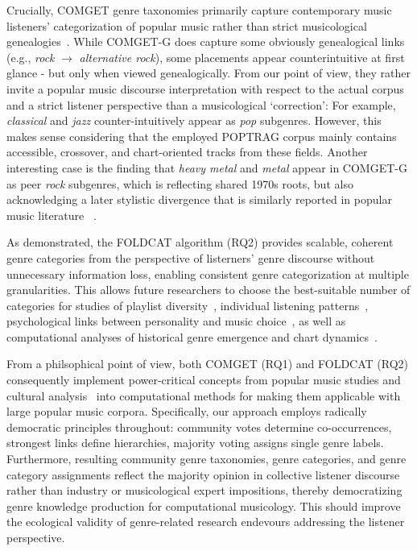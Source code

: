 \documentclass{article}
\begin{document}
Crucially, COMGET genre taxonomies primarily capture contemporary music listeners' categorization of popular music rather than strict musicological genealogies~\citep{pachetTaxonomyMusicalGenres2000}. While COMGET-G does capture some obviously genealogical links (e.g., \textit{rock} $\rightarrow$ \textit{alternative rock}), some placements appear counterintuitive at first glance - but only when viewed genealogically. From our point of view, they rather invite a popular music discourse interpretation with respect to the actual corpus and a strict listener perspective  than a musicological `correction':  For example, \textit{classical} and \textit{jazz} counter-intuitively appear as \textit{pop} subgenres. However, this makes sense considering that the employed POPTRAG corpus mainly contains accessible, crossover, and chart-oriented tracks from these fields. Another interesting case is the finding that \textit{heavy metal} and \textit{metal} appear in COMGET-G as peer \textit{rock} subgenres, which is reflecting shared 1970s roots, but also acknowledging a later stylistic divergence that is similarly reported in popular music literature ~\citep{gracykHeavyMetalGenre2016}.

As demonstrated, the FOLDCAT algorithm (RQ2) provides scalable, coherent genre categories from the perspective of listerners' genre discourse without unnecessary information loss, enabling consistent genre categorization at multiple granularities. This allows future researchers to choose the best-suitable number of categories for studies of playlist diversity~\citep{porcaro20YearsPlaylists2019}, individual listening patterns~\citep{peterson1992understanding}, psychological links between personality and music choice~\citep{andersonJustWayYou2021}, as well as computational analyses of historical genre emergence and chart dynamics~\citep{petitbon_hitchcock_2022}.  

From a philsophical point of view, both COMGET (RQ1) and FOLDCAT (RQ2) consequently implement power-critical concepts from popular music studies and cultural analysis~\citep{dugayDoingCulturalStudies2013} into computational methods for making them applicable with large popular music corpora. Specifically, our approach employs radically democratic principles throughout: community votes determine co-occurrences, strongest links define hierarchies, majority voting assigns single genre labels. Furthermore, resulting community genre taxonomies, genre categories, and genre category assignments reflect the majority opinion in collective listener discourse rather than industry or musicological expert impositions, thereby democratizing genre knowledge production for computational musicology. This should improve the ecological validity of  genre-related research endevours addressing the listener perspective.
\end{document}
